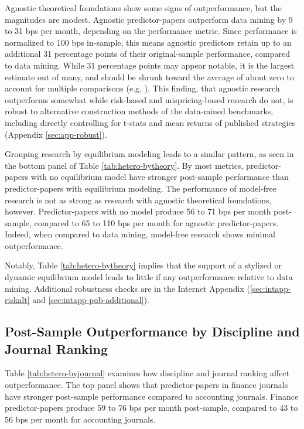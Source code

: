 Agnostic theoretical foundations show some signs of outperformance, but the magnitudes are modest. Agnostic predictor-papers outperform data mining by 9 to 31 bps per month, depending on the performance metric. Since performance is normalized to 100 bps in-sample, this means agnostic predictors retain up to an additional 31 percentage points of their original-sample performance, compared to data mining. While 31 percentage points may appear notable, it is the largest estimate out of many, and should be shrunk toward the average of about zero to account for multiple comparisons (e.g. \citealt{chen2020publication}). This finding, that agnostic research outperforms somewhat while risk-based and mispricing-based research do not, is robust to alternative construction methods of the data-mined benchmarks, including directly controlling for t-stats and mean returns of published strategies (Appendix \ref{sec:app-robust}). 

Grouping research by equilibrium modeling leads to a similar pattern, as seen in the bottom panel of Table \ref{tab:hetero-bytheory}. By most metrics, predictor-papers with no equilibrium model have stronger post-sample performance than predictor-papers with equilibrium modeling. The performance of model-free research is not as strong as research with agnostic theoretical foundations, however. Predictor-papers with no model produce 56 to 71 bps per month post-sample, compared to 65 to 110 bps per month for agnostic predictor-papers. Indeed, when compared to data mining, model-free research shows minimal outperformance. 

Notably, Table \ref{tab:hetero-bytheory} implies that the support of a stylized or dynamic equilibrium model leads to little if any outperformance relative to data mining. Additional robustness checks are in the Internet Appendix (\ref{sec:intapp-riskalt} and \ref{sec:intapp-pub-additional}).


\subsection{Post-Sample Outperformance by Discipline and Journal Ranking}\label{sec:hetero-discipline}

Table \ref{tab:hetero-byjournal} examines how discipline and journal ranking affect outperformance. The top panel shows that predictor-papers in finance journals have stronger post-sample performance compared to accounting journals. Finance predictor-papers produce 59 to 76 bps per month post-sample, compared to 43 to 56 bps per month for accounting journals. 

